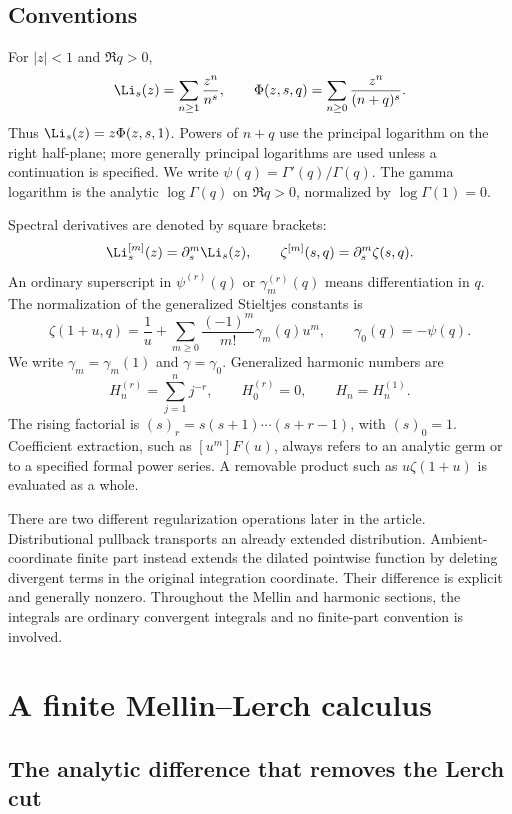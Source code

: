 \subsection{Conventions}

For $|z|<1$ and $\Re q>0$,
\[
 \Li_s(z)=\sum_{n\ge1}\frac{z^n}{n^s},\qquad
 \Phi(z,s,q)=\sum_{n\ge0}\frac{z^n}{(n+q)^s}.
\]
Thus $\Li_s(z)=z\Phi(z,s,1)$. Powers of $n+q$ use the principal logarithm on the right half-plane; more generally principal logarithms are used unless a continuation is specified. We write $\psi(q)=\Gamma'(q)/\Gamma(q)$. The gamma logarithm is the analytic $\log\Gamma(q)$ on $\Re q>0$, normalized by $\log\Gamma(1)=0$.

Spectral derivatives are denoted by square brackets:
\[
 \Li_s^{[m]}(z)=\partial_s^m\Li_s(z),\qquad
 \zeta^{[m]}(s,q)=\partial_s^m\zeta(s,q).
\]
An ordinary superscript in $\psi^{(r)}(q)$ or $\gamma_m^{(r)}(q)$ means differentiation in $q$. The normalization of the generalized Stieltjes constants is
\begin{equation}\label{mld:eq:stieltjes-definition}
 \zeta(1+u,q)=\frac1u+
       \sum_{m\ge0}\frac{(-1)^m}{m!}\gamma_m(q)u^m,
 \qquad \gamma_0(q)=-\psi(q).
\end{equation}
We write $\gamma_m=\gamma_m(1)$ and $\gamma=\gamma_0$. Generalized harmonic numbers are
\[
 H_n^{(r)}=\sum_{j=1}^n j^{-r},\qquad H_0^{(r)}=0,
 \qquad H_n=H_n^{(1)}.
\]
The rising factorial is $(s)_r=s(s+1)\cdots(s+r-1)$, with $(s)_0=1$. Coefficient extraction, such as $[u^m]F(u)$, always refers to an analytic germ or to a specified formal power series. A removable product such as $u\zeta(1+u)$ is evaluated as a whole.

There are two different regularization operations later in the article. Distributional pullback transports an already extended distribution. Ambient-coordinate finite part instead extends the dilated pointwise function by deleting divergent terms in the original integration coordinate. Their difference is explicit and generally nonzero. Throughout the Mellin and harmonic sections, the integrals are ordinary convergent integrals and no finite-part convention is involved.


\section{A finite Mellin--Lerch calculus}\label{mld:sec:mellin}

\subsection{The analytic difference that removes the Lerch cut}


